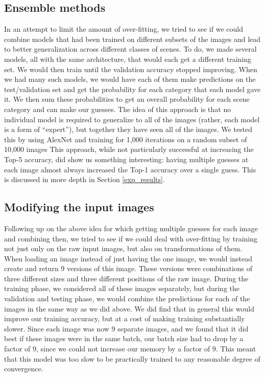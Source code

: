\documentclass[10pt,twocolumn,letterpaper]{article}
\begin{document}
\subsection{Ensemble methods}
\label{ensemble}
In an attempt to limit the amount of over-fitting, we tried to see if we could combine models that had been trained on different subsets of the images and lead to better generalization across different classes of scenes.  To do, we made several models, all with the same architecture, that would each get a different training set.  We would then train until the validation accuracy stopped improving.  When we had many such models, we would have each of them make predictions on the test/validation set and get the probability for each category that each model gave it.  We then sum these probabilities to get an overall probability for each scene category and can make our guesses.  The idea of this approach is that no individual model is required to generalize to all of the images (rather, each model is a form of ``expert''), but together they have seen all of the images.  We tested this by using AlexNet and training for 1,000 iterations on a random subset of 10,000 images  This approach, while not particularly successful at increasing the Top-5 accuracy, did show us something interesting: having multiple guesses at each image almost always increased the Top-1 accuracy over a single guess. This is discussed in more depth in
Section \ref{exp_results}.

\subsection{Modifying the input images}
\label{mod_input}
Following up on the above idea for which getting multiple guesses for each image and combining then, we tried to see if we could deal with over-fitting by training not just only on the raw input images, but also on transformations of them.  When loading an image instead of just having the one image, we would instead create and return 9 versions of this image.  These versions were combinations of three different sizes and three different positions of the raw image.  During the training phase, we considered all of these images separately, but during the validation and testing phase, we would combine the predictions for each of the images in the same way as we did above.  We did find that in general this would improve our training accuracy, but at a cost of making training substantially slower.  Since each image was now 9 separate images, and we found that it did best if these images were in the same batch, our batch size had to drop by a factor of 9, since we could not increase our memory by a factor of 9.  This meant that this model was too slow to be practically trained to any reasonable degree of convergence.
\end{document}
